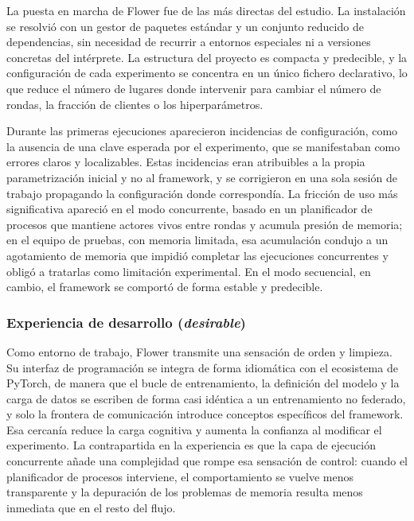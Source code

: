 La puesta en marcha de Flower fue de las más directas del estudio. La instalación se
resolvió con un gestor de paquetes estándar y un conjunto reducido de dependencias, sin
necesidad de recurrir a entornos especiales ni a versiones concretas del intérprete. La
estructura del proyecto es compacta y predecible, y la configuración de cada experimento se
concentra en un único fichero declarativo, lo que reduce el número de lugares donde
intervenir para cambiar el número de rondas, la fracción de clientes o los hiperparámetros.

Durante las primeras ejecuciones aparecieron incidencias de configuración, como la ausencia
de una clave esperada por el experimento, que se manifestaban como errores claros y
localizables. Estas incidencias eran atribuibles a la propia parametrización inicial y no al
framework, y se corrigieron en una sola sesión de trabajo propagando la configuración donde
correspondía. La fricción de uso más significativa apareció en el modo concurrente, basado
en un planificador de procesos que mantiene actores vivos entre rondas y acumula presión de
memoria; en el equipo de pruebas, con memoria limitada, esa acumulación condujo a un agotamiento
de memoria que impidió completar las ejecuciones concurrentes y obligó a tratarlas como
limitación experimental. En el modo secuencial, en cambio, el framework se comportó de forma
estable y predecible.

\subsubsection{Experiencia de desarrollo (\textit{desirable})}\label{sec:usab-flower-desirable}

Como entorno de trabajo, Flower transmite una sensación de orden y limpieza. Su interfaz de
programación se integra de forma idiomática con el ecosistema de PyTorch, de manera que el
bucle de entrenamiento, la definición del modelo y la carga de datos se escriben de forma
casi idéntica a un entrenamiento no federado, y solo la frontera de comunicación introduce
conceptos específicos del framework. Esa cercanía reduce la carga cognitiva y aumenta la
confianza al modificar el experimento. La contrapartida en la experiencia es que la capa de
ejecución concurrente añade una complejidad que rompe esa sensación de control: cuando el
planificador de procesos interviene, el comportamiento se vuelve menos transparente y la
depuración de los problemas de memoria resulta menos inmediata que en el resto del flujo.

